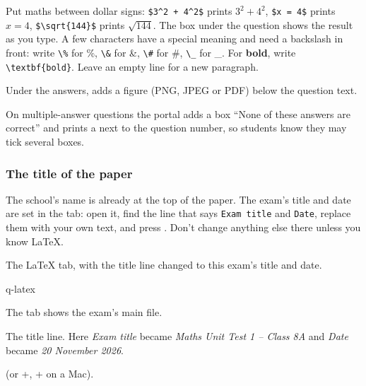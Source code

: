 \documentclass[11pt]{article}
\begin{document}
Put maths between dollar signs: \verb|$3^2 + 4^2$| prints $3^2+4^2$, \verb|$x = 4$| prints $x=4$, \verb|$\sqrt{144}$| prints $\sqrt{144}$. The box under the question shows the result as you type. A few characters have a special meaning and need a backslash in front: write \verb|\%| for \%, \verb|\&| for \&, \verb|\#| for \#, \verb|\_| for \_. For \textbf{bold}, write \verb|\textbf{bold}|. Leave an empty line for a new paragraph.

\begin{tip}[Pictures]
Under the answers,  adds a figure (PNG, JPEG or PDF) below the question text.
\end{tip}

\begin{tip}
On multiple-answer questions the portal adds a box ``None of these answers are correct'' and prints a \raisebox{-1pt}{\textsf{\scriptsize$\clubsuit$}} next to the question number, so students know they may tick several boxes.
\end{tip}

\subsubsection{The title of the paper}

The school's name is already at the top of the paper. The exam's title and date are set in the  tab: open it, find the line that says \texttt{Exam title} and \texttt{Date}, replace them with your own text, and press . Don't change anything else there unless you know LaTeX.

\begin{keep}
\begin{guidefig}{The LaTeX tab, with the title line changed to this exam's title and date.}
\begin{shot}{q-latex}
\end{shot}
\end{guidefig}
\begin{callouts}
  \item The  tab shows the exam's main file.
  \item The title line. Here \emph{Exam title} became \emph{Maths Unit Test 1 -- Class 8A} and \emph{Date} became \emph{20 November 2026}.
  \item {} (or +, + on a Mac).
\end{callouts}
\end{keep}
\end{document}
